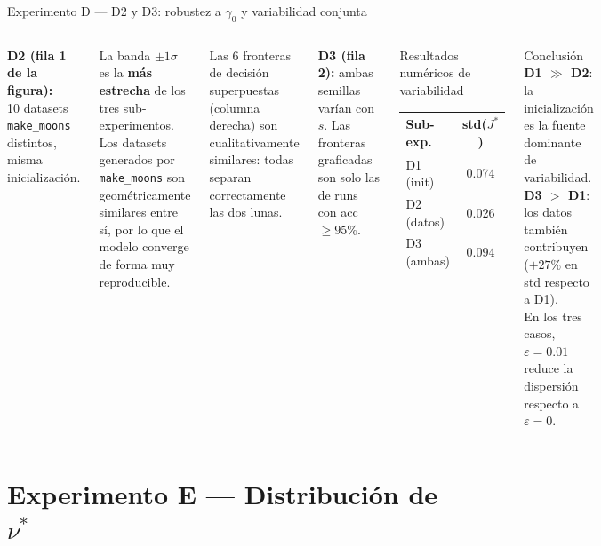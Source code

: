\documentclass[10pt]{beamer}
\begin{document}
\begin{frame}{Experimento D — D2 y D3: robustez a $\gamma_0$ y variabilidad conjunta}

\begin{columns}

\textbf{D2 (fila 1 de la figura):}\\
10 datasets \texttt{make\_moons} distintos, misma inicialización.

\medskip
La banda $\pm 1\sigma$ es la \textbf{más estrecha} de los tres sub-experimentos. Los datasets generados por \texttt{make\_moons} son geométricamente similares entre sí, por lo que el modelo converge de forma muy reproducible.

Las 6 fronteras de decisión superpuestas (columna derecha) son cualitativamente similares: todas separan correctamente las dos lunas.

\bigskip
\textbf{D3 (fila 2):} ambas semillas varían con $s$. Las fronteras graficadas son solo las de runs con acc~$\geq 95\%$.

\begin{block}{Resultados numéricos de variabilidad}
  \begin{tabular}{lc}
    \toprule
    Sub-exp. & std($J^*$) \\
    \midrule
    D1 (init) & 0.074 \\
    D2 (datos) & 0.026 \\
    D3 (ambas) & 0.094 \\
    \bottomrule
  \end{tabular}
\end{block}

\begin{alertblock}{Conclusión}
  \textbf{D1 $\gg$ D2}: la inicialización es la fuente dominante de variabilidad.\\[4pt]
  \textbf{D3 $>$ D1}: los datos también contribuyen ($+27\%$ en std respecto a D1).\\[4pt]
  En los tres casos, $\varepsilon=0.01$ reduce la dispersión respecto a $\varepsilon=0$.
\end{alertblock}
\end{columns}

\end{frame}

\section{Experimento E — Distribución de $\nu^*$}
\end{document}
